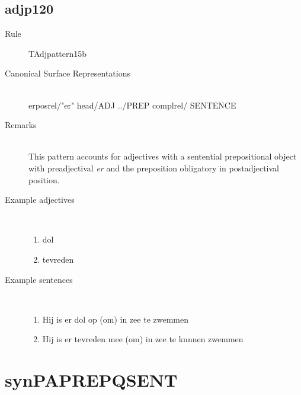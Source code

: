   \subsection{adjp120}
\begin{description}
  \item [Rule] TAdjpattern15b
  \item [Canonical Surface Representations] \mbox{}\\ erposrel/"er" head/ADJ ../PREP complrel/
SENTENCE
  \item [Remarks] \mbox{}\\ This pattern accounts for adjectives with a sentential 
prepositional object with preadjectival {\em er} and the preposition 
obligatory in postadjectival position. 

  \item [Example adjectives] \mbox{}\\
\begin{enumerate}
  \item dol
  \item tevreden
\end{enumerate}
  \item [Example sentences]\mbox{}\\
\begin{enumerate}
  \item Hij is er dol op (om) in zee te zwemmen 
  \item Hij is er tevreden mee (om) in zee te kunnen zwemmen 
\end{enumerate}
\end{description}
\newpage
\section{synPAPREPQSENT}
